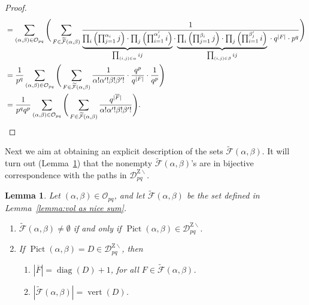 \documentclass[noamsfonts,10pt]{amsart}
\newcommand{\DZ}{\mathcal{D}^{\mathrm{Z} \!\!\!\! \backslash}}
\newcommand{\al}{\alpha}
\newcommand{\be}{\beta}
\DeclareMathOperator{\Pic}{Pict}
\renewcommand{\O}{\mathcal{O}}
\newcommand{\F}{\mathcal{F}}
\newcommand{\dd}{\operatorname{diag}}
\newcommand{\vv}{\operatorname{vert}}
\newcommand{\1}{\mathbf{1}}
\theoremstyle{plain}
\newtheorem{lemma}[theorem]{Lemma}
\theoremstyle{definition}
\numberwithin{equation}{section}
\begin{document}
\begin{proof}
\begin{align*}
        &= \sum_{(\al,\be) \in \O_{pq}} \Bigg( \sum_{F \in \widetilde{\F}(\al,\be)} \frac{1}{ \underbrace{\textstyle \prod_{i}\left( \prod_{j=1}^{\al_i} j \right) \cdot \prod_{j}\left( \prod_{i=1}^{\al'_j} i \right)}_{ \prod_{(i,j) \in \al} ij} \cdot
        \underbrace{\textstyle \prod_{i}\left( \prod_{j=1}^{\be_i} j \right) \cdot \prod_{j}\left( \prod_{i=1}^{\be'_j} i \right)}_{ \prod_{(i,j) \in \be} ij} {} \cdot q^{|F|} \cdot p^q} \Bigg) \\
        &= \frac{1}{p^q}  \sum_{(\al,\be) \in \O_{pq}} \Bigg( \sum_{F \in \widetilde{\F}(\al,\be)} \frac{1}{\al! \al'! \be! \be'!} \cdot \frac{q^p}{q^{|F|}} \cdot \frac{1}{q^p} \Bigg) \\
        & = \frac{1}{p^q q^p}  \sum_{(\al,\be) \in \O_{pq}} \Bigg( \sum_{F \in \widetilde{\F}(\al,\be)} \frac{q^{|\overline{F}|}}{\al! \al'! \be! \be'!} \Bigg). \qedhere
    \end{align*}
\end{proof}

Next we aim at obtaining an explicit description of the sets $\widetilde{\F}(\al,\be)$.
It will turn out (Lemma~\ref{lemma:F tilde}) that the nonempty $\widetilde{\F}(\al,\be)$'s are in bijective correspondence with the paths in $\DZ_{pq}$.

\begin{lemma}
    \label{lemma:F tilde}
    Let $(\al,\be) \in \O_{pq}$, and let $\widetilde{\F}(\al,\be)$ be the set defined in Lemma~\ref{lemma:vol as nice sum}.
    \begin{enumerate}[label=\textup{(\arabic*)},ref=\arabic*]
        \item \label{only DZ} $\widetilde{\F}(\al,\be) \neq \emptyset$ if and only if $\Pic(\al,\be) \in \DZ_{pq}$.
        
        \item \label{F tilde part 2} If $\Pic(\al,\be) = D \in \DZ_{pq}$, then
        \begin{enumerate}[label=\textup{(\alph*)},ref=\alph*]

        \item \label{size Fbar = diag + 1} $|\overline{F}|
            = \dd(D) + 1$, for all $F \in \widetilde{\F}(\al,\be)$.

            \item \label{size F tilde = vert} $\left| \widetilde{\F}(\al,\be) \right| = \vv(D)$.
            
        \end{enumerate}
    \end{enumerate}
\end{lemma}
\end{document}
